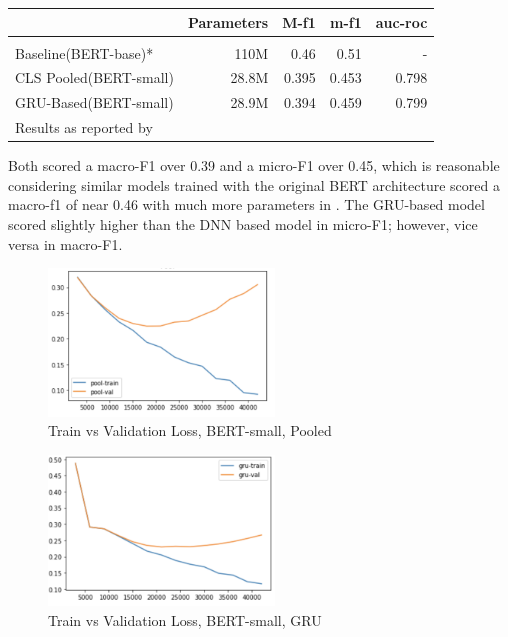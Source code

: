 \documentclass[conference]{IEEEtran}
\begin{document}
\begin{adjustbox}{width=\columnwidth,center}
\begin{tabular}{lrrrr}
    {} & Parameters & M-f1 &  m-f1 & auc-roc \\
    \hline \\
    Baseline(BERT-base)* & 110M & 0.46 & 0.51 & - \\
    CLS Pooled(BERT-small) & 28.8M &  0.395 & 0.453 & 0.798 \\
    GRU-Based(BERT-small) & 28.9M &  0.394 & 0.459 & 0.799
    \hline \\
    \footnotesize{Results as reported by \cite{DBLP:journals/corr/abs-2005-00547}}
\end{tabular}
\end{adjustbox}

Both scored a macro-F1 over 0.39 and a micro-F1 over 0.45, which is reasonable considering similar models trained with the original BERT architecture scored a macro-f1 of near 0.46 with much more parameters in \cite{DBLP:journals/corr/abs-2005-00547} \cite{https://doi.org/10.48550/arxiv.2109.01900}. The GRU-based model scored slightly higher than the DNN based model in micro-F1; however, vice versa in macro-F1.

\begin{figure}[htbp]
\centerline{\includegraphics[width=6cm, keepaspectratio,]{fig/val-train-pool.png}}
\caption{Train vs Validation Loss, BERT-small, Pooled}
\label{fig}
\end{figure}

\begin{figure}[htbp]
\centerline{\includegraphics[width=6cm, keepaspectratio,]{fig/val-train-gru.png}}
\caption{Train vs Validation Loss, BERT-small, GRU}
\label{fig}
\end{figure}
\end{document}
